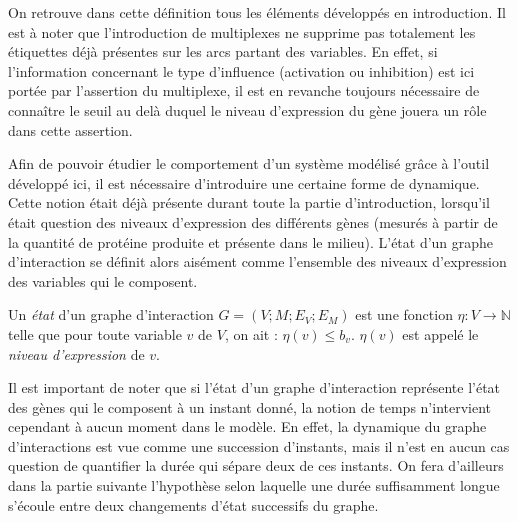 On retrouve dans cette définition tous les éléments développés en introduction. Il est à noter que l'introduction de multiplexes ne supprime pas totalement les étiquettes déjà présentes sur les arcs partant des variables. En effet, si l'information concernant le type d'influence (activation ou inhibition) est ici portée par l'assertion du multiplexe, il est en revanche toujours nécessaire de connaître le seuil au delà duquel le niveau d'expression du gène jouera un rôle dans cette assertion.

Afin de pouvoir étudier le comportement d'un système modélisé grâce à l'outil développé ici, il est nécessaire d'introduire une certaine forme de dynamique. Cette notion était déjà présente durant toute la partie d'introduction, lorsqu'il était question des niveaux d'expression des différents gènes (mesurés à partir de la quantité de protéine produite et présente dans le milieu). L'état d'un graphe d'interaction se définit alors aisément comme l'ensemble des niveaux d'expression des variables qui le composent.
\begin{definition}
Un \emph{état} d'un graphe d'interaction $G = (V ; M ; E_V ; E_M)$ est une fonction $\eta : V \rightarrow \mathbb{N}$ telle que pour toute variable $v$ de $V$, on ait : $\eta(v) \leq b_v$. $\eta(v)$ est appelé le \emph{niveau d'expression} de $v$.
\end{definition}

Il est important de noter que si l'état d'un graphe d'interaction représente l'état des gènes qui le composent à un instant donné, la notion de temps n'intervient cependant à aucun moment dans le modèle. En effet, la dynamique du graphe d'interactions est vue comme une succession d'instants, mais il n'est en aucun cas question de quantifier la durée qui sépare deux de ces instants. On fera d'ailleurs dans la partie suivante l'hypothèse selon laquelle une durée suffisamment longue s'écoule entre deux changements d'état successifs du graphe.

